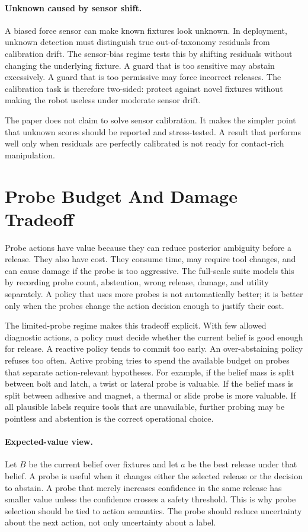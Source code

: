 \documentclass{article}
\begin{document}
\paragraph{Unknown caused by sensor shift.}
A biased force sensor can make known fixtures look unknown. In deployment,
unknown detection must distinguish true out-of-taxonomy residuals from
calibration drift. The sensor-bias regime tests this by shifting residuals
without changing the underlying fixture. A guard that is too sensitive may
abstain excessively. A guard that is too permissive may force incorrect
releases. The calibration task is therefore two-sided: protect against novel
fixtures without making the robot useless under moderate sensor drift.

The paper does not claim to solve sensor calibration. It makes the simpler
point that unknown scores should be reported and stress-tested. A result that
performs well only when residuals are perfectly calibrated is not ready for
contact-rich manipulation.

\section{Probe Budget And Damage Tradeoff}

Probe actions have value because they can reduce posterior ambiguity before a
release. They also have cost. They consume time, may require tool changes, and
can cause damage if the probe is too aggressive. The full-scale suite models
this by recording probe count, abstention, wrong release, damage, and utility
separately. A policy that uses more probes is not automatically better; it is
better only when the probes change the action decision enough to justify their
cost.

The limited-probe regime makes this tradeoff explicit. With few allowed
diagnostic actions, a policy must decide whether the current belief is good
enough for release. A reactive policy tends to commit too early. An
over-abstaining policy refuses too often. Active probing tries to spend the
available budget on probes that separate action-relevant hypotheses. For
example, if the belief mass is split between bolt and latch, a twist or lateral
probe is valuable. If the belief mass is split between adhesive and magnet, a
thermal or slide probe is more valuable. If all plausible labels require tools
that are unavailable, further probing may be pointless and abstention is the
correct operational choice.

\paragraph{Expected-value view.}
Let $B$ be the current belief over fixtures and let $a$ be the best release
under that belief. A probe is useful when it changes either the selected
release or the decision to abstain. A probe that merely increases confidence in
the same release has smaller value unless the confidence crosses a safety
threshold. This is why probe selection should be tied to action semantics. The
probe should reduce uncertainty about the next action, not only uncertainty
about a label.
\end{document}
